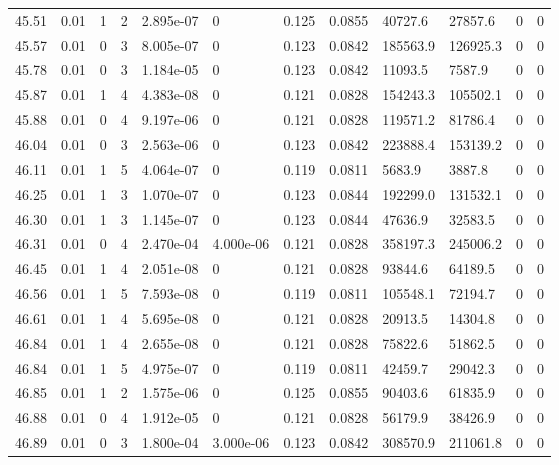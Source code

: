 \documentclass[preview]{standalone}
\begin{document}
{{{{{{{{{{{{{\begin{tabular}{L{1.2cm}C{1.2cm} C{0.3cm}C{0.5cm} C{1.4cm}C{1.4cm} C{1.4cm}C{1.4cm} C{1.6cm}C{1.6cm} C{1.6cm}C{1.6cm}}
  45.51  &  0.01  & 1     &  2 &  2.895e-07  & 0  &  0.125&   0.0855& 40727.6 & 27857.6   &  0 & 0  \\ 
  45.57  &  0.01  & 0     &  3 &  8.005e-07  & 0  &  0.123&   0.0842& 185563.9 & 126925.3   &  0 & 0  \\ 
  45.78  &  0.01  & 0     &  3 &  1.184e-05  & 0  &  0.123&   0.0842& 11093.5 & 7587.9   &  0 & 0  \\ 
  45.87  &  0.01  & 1     &  4 &  4.383e-08  & 0  &  0.121&   0.0828& 154243.3 & 105502.1   &  0 & 0  \\ 
  45.88  &  0.01  & 0     &  4 &  9.197e-06  & 0  &  0.121&   0.0828& 119571.2 & 81786.4   &  0 & 0  \\ 
  46.04  &  0.01  & 0     &  3 &  2.563e-06  & 0  &  0.123&   0.0842& 223888.4 & 153139.2   &  0 & 0  \\ 
  46.11  &  0.01  & 1     &  5 &  4.064e-07  & 0  &  0.119&   0.0811& 5683.9 & 3887.8   &  0 & 0  \\ 
  46.25  &  0.01  & 1     &  3 &  1.070e-07  & 0  &  0.123&   0.0844& 192299.0 & 131532.1   &  0 & 0  \\ 
  46.30  &  0.01  & 1     &  3 &  1.145e-07  & 0  &  0.123&   0.0844& 47636.9 & 32583.5   &  0 & 0  \\ 
  46.31  &  0.01  & 0     &  4 &  2.470e-04  & 4.000e-06  &  0.121&   0.0828& 358197.3 & 245006.2   &  0 & 0  \\ 
  46.45  &  0.01  & 1     &  4 &  2.051e-08  & 0  &  0.121&   0.0828& 93844.6 & 64189.5   &  0 & 0  \\ 
  46.56  &  0.01  & 1     &  5 &  7.593e-08  & 0  &  0.119&   0.0811& 105548.1 & 72194.7   &  0 & 0  \\ 
  46.61  &  0.01  & 1     &  4 &  5.695e-08  & 0  &  0.121&   0.0828& 20913.5 & 14304.8   &  0 & 0  \\ 
  46.84  &  0.01  & 1     &  4 &  2.655e-08  & 0  &  0.121&   0.0828& 75822.6 & 51862.5   &  0 & 0  \\ 
  46.84  &  0.01  & 1     &  5 &  4.975e-07  & 0  &  0.119&   0.0811& 42459.7 & 29042.3   &  0 & 0  \\ 
  46.85  &  0.01  & 1     &  2 &  1.575e-06  & 0  &  0.125&   0.0855& 90403.6 & 61835.9   &  0 & 0  \\ 
  46.88  &  0.01  & 0     &  4 &  1.912e-05  & 0  &  0.121&   0.0828& 56179.9 & 38426.9   &  0 & 0  \\ 
  46.89  &  0.01  & 0     &  3 &  1.800e-04  & 3.000e-06  &  0.123&   0.0842& 308570.9 & 211061.8   &  0 & 0  \\ 

\end{tabular}}}}}}}}}}}}}}
\end{document}
